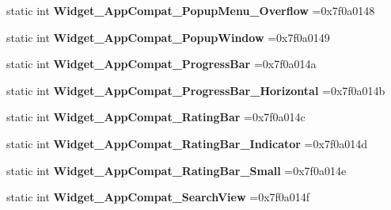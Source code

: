 \begin{DoxyCompactItemize}
static int {\bfseries Widget\+\_\+\+App\+Compat\+\_\+\+Popup\+Menu\+\_\+\+Overflow} =0x7f0a0148
\item 
\mbox{\label{classandroid_1_1support_1_1graphics_1_1drawable_1_1R_1_1style_a88f3384f4874d077c0db8c3289a63a43}} 
static int {\bfseries Widget\+\_\+\+App\+Compat\+\_\+\+Popup\+Window} =0x7f0a0149
\item 
\mbox{\label{classandroid_1_1support_1_1graphics_1_1drawable_1_1R_1_1style_a08e3304648f98ef3d746b21a16f9c87c}} 
static int {\bfseries Widget\+\_\+\+App\+Compat\+\_\+\+Progress\+Bar} =0x7f0a014a
\item 
\mbox{\label{classandroid_1_1support_1_1graphics_1_1drawable_1_1R_1_1style_a1712da210a5aedbdc4e4f9bc75c46a51}} 
static int {\bfseries Widget\+\_\+\+App\+Compat\+\_\+\+Progress\+Bar\+\_\+\+Horizontal} =0x7f0a014b
\item 
\mbox{\label{classandroid_1_1support_1_1graphics_1_1drawable_1_1R_1_1style_af817c3f007f0627fe7f5e87fdba85c0f}} 
static int {\bfseries Widget\+\_\+\+App\+Compat\+\_\+\+Rating\+Bar} =0x7f0a014c
\item 
\mbox{\label{classandroid_1_1support_1_1graphics_1_1drawable_1_1R_1_1style_a84f0bee2bc8a842f6bb014adcecc193f}} 
static int {\bfseries Widget\+\_\+\+App\+Compat\+\_\+\+Rating\+Bar\+\_\+\+Indicator} =0x7f0a014d
\item 
\mbox{\label{classandroid_1_1support_1_1graphics_1_1drawable_1_1R_1_1style_a2af0e9d4c910321b0d95b84a06c7b0be}} 
static int {\bfseries Widget\+\_\+\+App\+Compat\+\_\+\+Rating\+Bar\+\_\+\+Small} =0x7f0a014e
\item 
\mbox{\label{classandroid_1_1support_1_1graphics_1_1drawable_1_1R_1_1style_a8b37fffcf565a495c4bfb292b3aa7949}} 
static int {\bfseries Widget\+\_\+\+App\+Compat\+\_\+\+Search\+View} =0x7f0a014f
\item 

\end{DoxyCompactItemize}
